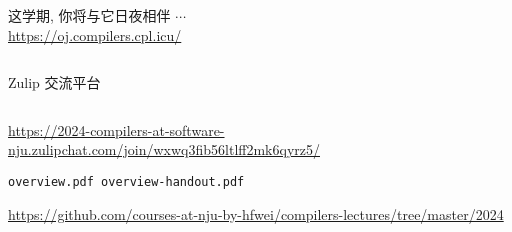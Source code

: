 \begin{frame}{}
  \begin{center}
    这学期, 你将与它日夜相伴 $\cdots$ \\[3pt]
    \url{https://oj.compilers.cpl.icu/}
  \end{center}
  \begin{columns}
  \end{columns}
\end{frame}

\begin{frame}{}
  \begin{center}
    Zulip 交流平台
    \begin{columns}
    \end{columns}

    \vspace{0.30cm}
    {\small \url{https://2024-compilers-at-software-nju.zulipchat.com/join/wxwq3fib56ltlff2mk6qyrz5/}}
  \end{center}
\end{frame}

\begin{frame}{}
  \begin{center}
    \texttt{overview.pdf \qquad overview-handout.pdf}


    \vspace{0.50cm}
    \url{https://github.com/courses-at-nju-by-hfwei/compilers-lectures/tree/master/2024}
  \end{center}
\end{frame}



